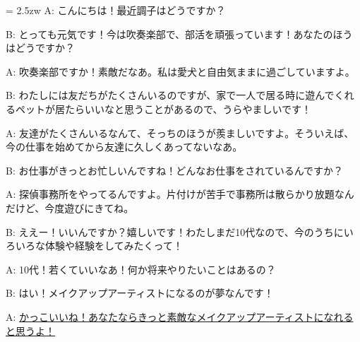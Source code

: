 \documentclass[11pt]{amsart}
\title{}
\author{}
\newenvironment{hangall}[1]{\hangindent = 2.5zw\everypar{\hangindent = 2.5zw}}{}
\begin{document}
\maketitle
\begin{hangall}{}%
A: こんにちは！最近調子はどうですか？

B: とっても元気です！今は吹奏楽部で、部活を頑張っています！あなたのほうはどうですか？

A: 吹奏楽部ですか！素敵だなあ。私は愛犬と自由気ままに過ごしていますよ。

B: わたしには友だちがたくさんいるのですが、家で一人で居る時に遊んでくれるペットが居たらいいなと思うことがあるので、うらやましいです！

A: 友達がたくさんいるなんて、そっちのほうが羨ましいですよ。そういえば、今の仕事を始めてから友達に久しくあってないなあ。

B: お仕事がきっとお忙しいんですね！どんなお仕事をされているんですか？

A: 探偵事務所をやってるんですよ。片付けが苦手で事務所は散らかり放題なんだけど、今度遊びにきてね。

B: ええー！いいんですか？嬉しいです！わたしまだ10代なので、今のうちにいろいろな体験や経験をしてみたくって！

A: 10代！若くていいなあ！何か将来やりたいことはあるの？

B: はい！メイクアップアーティストになるのが夢なんです！

A: \ul{かっこいいね！あなたならきっと素敵なメイクアップアーティストになれると思うよ！}\end{hangall}
\end{document}
